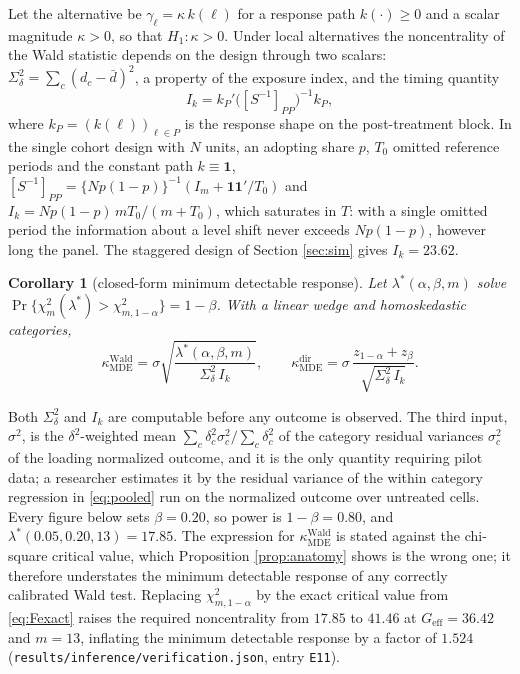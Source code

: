 \documentclass[12pt]{article}
\newtheorem{corollary}{Corollary}
\theoremstyle{definition}
\numberwithin{equation}{section}
\begin{document}
Let the alternative be $\gamma_\ell = \kappa\, k(\ell)$ for a response path
$k(\cdot) \ge 0$ and a scalar magnitude $\kappa > 0$, so that $H_1: \kappa > 0$.
Under local alternatives the noncentrality of the Wald statistic depends on the
design through two scalars: $\Sigma_\delta^2 = \sum_c (d_c - \bar{d})^2$, a
property of the exposure index, and the timing quantity
\begin{equation}
I_k = k_P'\big([S^{-1}]_{PP}\big)^{-1}k_P ,
\label{eq:ik}
\end{equation}
where $k_P = (k(\ell))_{\ell \in P}$ is the response shape on the
post-treatment block. In the single cohort design with $N$ units, an adopting
share $p$, $T_0$ omitted reference periods and the constant path
$k \equiv \mathbf{1}$, $[S^{-1}]_{PP} = \{Np(1-p)\}^{-1}(I_m +
\mathbf{1}\mathbf{1}'/T_0)$ and $I_k = Np(1-p)\,mT_0/(m+T_0)$, which saturates
in $T$: with a single omitted period the information about a level shift never
exceeds $Np(1-p)$, however long the panel. The staggered design of Section
\ref{sec:sim} gives $I_k = 23.62$.

\begin{corollary}[closed-form minimum detectable response]
\label{cor:mde}
Let $\lambda^*(\alpha,\beta,m)$ solve $\Pr\{\chi^2_m(\lambda^*) >
\chi^2_{m,1-\alpha}\} = 1-\beta$. With a linear wedge and homoskedastic
categories,
\begin{equation}
\kappa^{\mathrm{Wald}}_{\mathrm{MDE}} = \sigma
\sqrt{\frac{\lambda^*(\alpha,\beta,m)}{\Sigma_\delta^2\, I_k}},
\qquad
\kappa^{\mathrm{dir}}_{\mathrm{MDE}} = \sigma\,
\frac{z_{1-\alpha}+z_\beta}{\sqrt{\Sigma_\delta^2\, I_k}} .
\label{eq:mde}
\end{equation}
\end{corollary}

Both $\Sigma_\delta^2$ and $I_k$ are computable before any outcome is observed.
The third input, $\sigma^2$, is the $\delta^2$-weighted mean $\sum_c \delta_c^2
\sigma_c^2/\sum_c \delta_c^2$ of the category residual variances $\sigma_c^2$ of
the loading normalized outcome, and it is the only quantity requiring pilot
data; a researcher estimates it by the residual variance of the within category
regression in \eqref{eq:pooled} run on the normalized outcome over untreated
cells. Every figure below sets $\beta = 0.20$, so power is $1-\beta = 0.80$, and
$\lambda^*(0.05,0.20,13) = 17.85$. The expression for
$\kappa^{\mathrm{Wald}}_{\mathrm{MDE}}$ is stated against the chi-square critical value, which Proposition \ref{prop:anatomy} shows is the wrong one; it
therefore understates the minimum detectable response of any correctly
calibrated Wald test. Replacing $\chi^2_{m,1-\alpha}$ by the exact critical
value from \eqref{eq:Fexact} raises the required noncentrality from $17.85$ to
$41.46$ at $G_{\mathrm{eff}} = 36.42$ and $m = 13$, inflating the minimum
detectable response by a factor of $1.524$
(\texttt{results/inference/verification.json}, entry \texttt{E11}).
\end{document}
